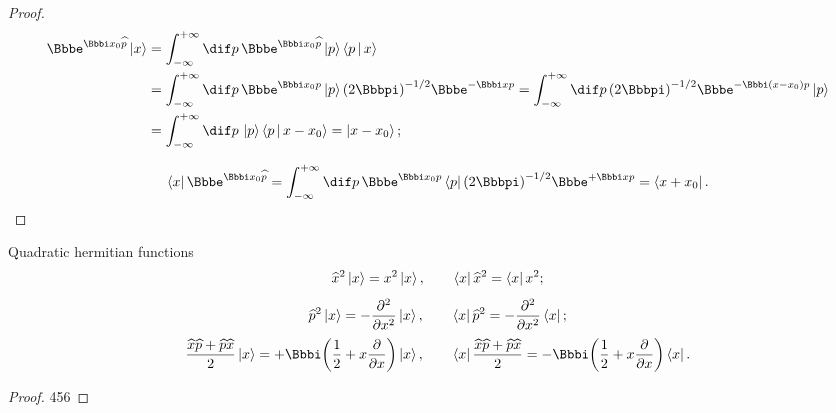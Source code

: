 \begin{proof}
\begin{align}
\ee^{\ii x_0 \widehat{p}} \Ket{x} &= \int_{-\infty}^{+\infty} \dif p\,
\ee^{\ii x_0 \widehat{p}}\Ket{p}\Braket{p | x} \nonumber \\
&= \int_{-\infty}^{+\infty} \dif p\,
\ee^{\ii x_0 p}\Ket{p}\rbr{2\pp}^{-1/2}\ee^{-\ii x p}
= \int_{-\infty}^{+\infty} \dif p\,
\rbr{2\pp}^{-1/2}\ee^{-\ii \rbr{x-x_0} p}\Ket{p} \nonumber \\
&= \int_{-\infty}^{+\infty} \dif p\,
\Ket{p}\Braket{p | x-x_0} = \Ket{x-x_0};
\label{eq:displace-x-ket}
\end{align}

\begin{equation}
\Bra{x} \ee^{\ii x_0 \widehat{p}} = \int_{-\infty}^{+\infty} \dif p\,
\ee^{\ii x_0 p}\Bra{p}\rbr{2\pp}^{-1/2}\ee^{+\ii x p}
= \Bra{x+x_0}.
\label{eq:displace-x-bra}
\end{equation}

\end{proof}

\begin{namedthm}{Quadratic hermitian functions}
\begin{equation}
\widehat{x}^2 \Ket{x} = x^2 \Ket{x}, \qquad
\Bra{x} \widehat{x}^2 = \Bra{x} x^2;
\end{equation}
\begin{equation}
	\widehat{p}^2 \Ket{x} = -{\frac{\partial{^2}}{\partial{x^2}}} \Ket{x}, \qquad
	\Bra{x} \widehat{p}^2 = -{\frac{\partial{^2}}{\partial{x^2}}} \Bra{x};
\end{equation}
\begin{equation}
	\frac{\widehat{x}\widehat{p} + \widehat{p}\widehat{x}}{2} \Ket{x}
	= +\ii \rbr{\frac{1}{2}+x\frpa{}{x}} \Ket{x}, \qquad
	\Bra{x} \frac{\widehat{x}\widehat{p} + \widehat{p}\widehat{x}}{2}
	= -\ii \rbr{\frac{1}{2}+x\frpa{}{x}} \Bra{x}.
\end{equation}

\end{namedthm} %
\begin{proof}
456
\end{proof}

